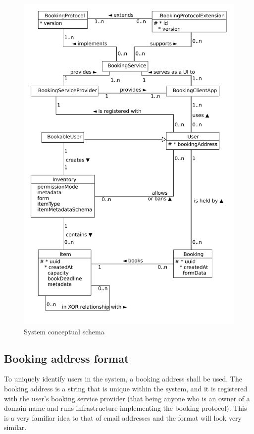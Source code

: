 \begin{figure}
    \centering
    \includegraphics[width=1.0\textwidth]{content/design/system_conceptual_schema.uxf.svg.pdf}
    \caption[System conceptual schema]{System conceptual schema}
    \label{fig:system_conceptual_schema}
\end{figure}

\subsection{Booking address format}

To uniquely identify users in the system, a booking address shall be used. The booking address is a string that is unique within the system, and it is registered with the user's booking service provider (that being anyone who is an owner of a domain name and runs infrastructure implementing the booking protocol). This is a very familiar idea to that of email addresses and the format will look very similar.

